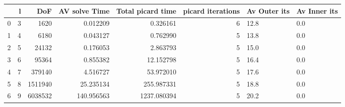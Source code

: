 \begin{tabular}{lrrrrrll}
\toprule
{} &  l &      DoF &  AV solve Time &  Total picard time &  picard iterations & Av Outer its & Av Inner its \\
\midrule
0 &  3 &     1620 &       0.012209 &           0.326161 &                  6 &         12.8 &          0.0 \\
1 &  4 &     6180 &       0.043127 &           0.762990 &                  5 &         13.8 &          0.0 \\
2 &  5 &    24132 &       0.176053 &           2.863793 &                  5 &         15.0 &          0.0 \\
3 &  6 &    95364 &       0.855382 &          12.152798 &                  5 &         16.4 &          0.0 \\
4 &  7 &   379140 &       4.516727 &          53.972010 &                  5 &         17.6 &          0.0 \\
5 &  8 &  1511940 &      25.235134 &         255.987331 &                  5 &         18.8 &          0.0 \\
6 &  9 &  6038532 &     140.956563 &        1237.080394 &                  5 &         20.2 &          0.0 \\
\bottomrule
\end{tabular}
